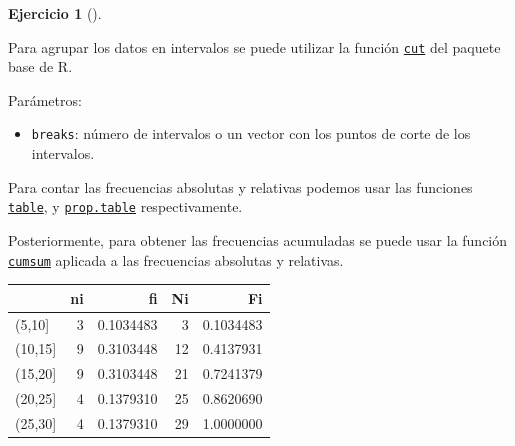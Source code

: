 \documentclass[
  spanish,
  a4paper,
]{scrreport}
\newenvironment{Shaded}{\begin{snugshade}}{\end{snugshade}}
\newcommand{\AttributeTok}[1]{\textcolor[rgb]{0.40,0.45,0.13}{#1}}
\newcommand{\CommentTok}[1]{\textcolor[rgb]{0.37,0.37,0.37}{#1}}
\newcommand{\DecValTok}[1]{\textcolor[rgb]{0.68,0.00,0.00}{#1}}
\newcommand{\FunctionTok}[1]{\textcolor[rgb]{0.28,0.35,0.67}{#1}}
\newcommand{\NormalTok}[1]{\textcolor[rgb]{0.00,0.23,0.31}{#1}}
\newcommand{\OtherTok}[1]{\textcolor[rgb]{0.00,0.23,0.31}{#1}}
\newcommand{\SpecialCharTok}[1]{\textcolor[rgb]{0.37,0.37,0.37}{#1}}
\providecommand{\tightlist}{%
  \setlength{\itemsep}{0pt}\setlength{\parskip}{0pt}}
\theoremstyle{definition}
\newtheorem{exercise}{Ejercicio}[chapter]
\theoremstyle{remark}
\begin{document}
\begin{exercise}[]
\begin{enumerate}
\begin{tcolorbox}
  Para agrupar los datos en intervalos se puede utilizar la función
  \href{https://www.rdocumentation.org/packages/base/versions/3.6.2/topics/cut}{\texttt{cut}}
  del paquete base de R.

  Parámetros:

  \begin{itemize}
  \tightlist
  \item
    \texttt{breaks}: número de intervalos o un vector con los puntos de
    corte de los intervalos.
  \end{itemize}

  Para contar las frecuencias absolutas y relativas podemos usar las
  funciones
  \href{https://www.rdocumentation.org/packages/base/versions/3.6.2/topics/table}{\texttt{table}},
  y
  \href{https://www.rdocumentation.org/packages/base/versions/3.6.2/topics/prop.table}{\texttt{prop.table}}
  respectivamente.

  Posteriormente, para obtener las frecuencias acumuladas se puede usar
  la función
  \href{https://www.rdocumentation.org/packages/base/versions/3.6.2/topics/cumsum}{\texttt{cumsum}}
  aplicada a las frecuencias absolutas y relativas.

\begin{Shaded}
\end{Shaded}

  \begin{longtable}[]{@{}lrrrr@{}}
  \toprule\noalign{}
  & ni & fi & Ni & Fi \\
  \midrule\noalign{}
  \endhead
  \bottomrule\noalign{}
  \endlastfoot
  (5,10{]} & 3 & 0.1034483 & 3 & 0.1034483 \\
  (10,15{]} & 9 & 0.3103448 & 12 & 0.4137931 \\
  (15,20{]} & 9 & 0.3103448 & 21 & 0.7241379 \\
  (20,25{]} & 4 & 0.1379310 & 25 & 0.8620690 \\
  (25,30{]} & 4 & 0.1379310 & 29 & 1.0000000 \\
  \end{longtable}


\end{tcolorbox}
\end{enumerate}
\end{exercise}
\end{document}
